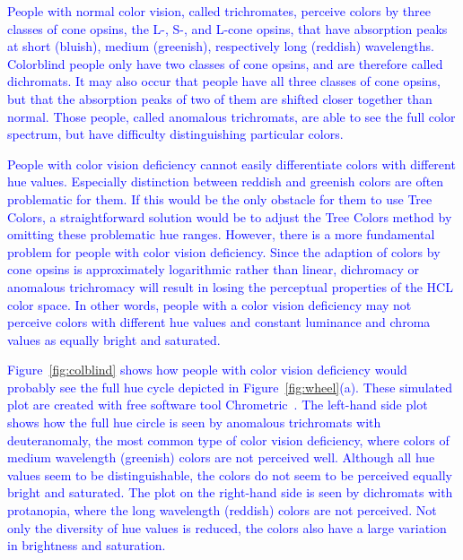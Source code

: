 \documentclass[journal]{vgtc}                %
\newcommand{\changedM}[1]{\textcolor{blue}{#1}}
\begin{document}
\changedM{People with normal color vision, called trichromates, perceive colors by three classes of cone opsins, the L-, S-, and L-cone opsins, that have absorption peaks at short (bluish), medium (greenish),  respectively long (reddish) wavelengths. Colorblind people only have two classes of cone opsins, and are therefore called dichromats. It may also occur that people have all three classes of cone opsins, but that the absorption peaks of two of them are shifted closer together than normal. Those people, called anomalous trichromats, are able to see the full color spectrum, but have difficulty distinguishing particular colors.}


\changedM{People with color vision deficiency cannot easily differentiate colors with different hue values. Especially distinction between reddish and greenish colors are often problematic for them. If this would be the only obstacle for them to use Tree Colors, a straightforward solution would be to adjust the Tree Colors method by omitting these problematic hue ranges. However, there is a more fundamental problem for people with color vision deficiency. Since the adaption of colors by cone opsins is approximately logarithmic rather than linear, dichromacy or anomalous trichromacy will result in losing the perceptual properties of the HCL color space. In other words, people with a color vision deficiency may not perceive colors with different hue values and constant luminance and chroma values as equally bright and saturated.}

\changedM{Figure~\ref{fig:colblind} shows how people with color vision deficiency would probably see the full hue cycle depicted in Figure~\ref{fig:wheel}(a). These simulated plot are created with free software tool Chrometric~\cite{chrometric}. The left-hand side plot shows how the full hue circle is seen by anomalous trichromats with deuteranomaly, the most common type of color vision deficiency, where colors of medium wavelength (greenish) colors are not perceived well. Although all hue values seem to be distinguishable, the colors do not seem to be perceived equally bright and saturated. The plot on the right-hand side is seen by dichromats with protanopia, where the long wavelength (reddish) colors are not perceived. Not only the diversity of hue values is reduced, the colors also have a large variation in brightness and saturation.} 
\end{document}

